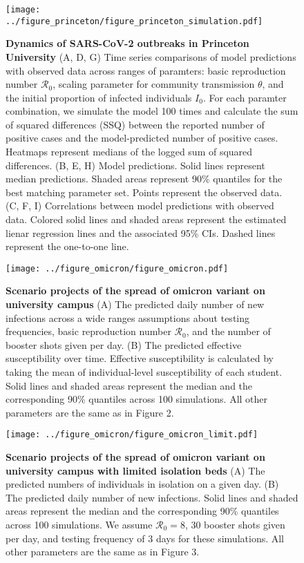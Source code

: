 \documentclass[12pt]{article}
\begin{document}
\pagebreak

\begin{figure}[!th]
\texttt{[image: ../figure\_princeton/figure\_princeton\_simulation.pdf]}
\caption{
\textbf{Dynamics of SARS-CoV-2 outbreaks in Princeton University}
(A, D, G) Time series comparisons of model predictions with observed data across ranges of paramters: basic reproduction number $\mathcal R_0$, scaling parameter for community transmission $\theta$, and the initial proportion of infected individuals $I_0$.
For each paramter combination, we simulate the model 100 times and calculate the sum of squared differences (SSQ) between the reported number of positive cases and the model-predicted number of positive cases. 
Heatmaps represent medians of the logged sum of squared differences.
(B, E, H) Model predictions. 
Solid lines represent median predictions.
Shaded areas represent 90\% quantiles for the best matching parameter set.
Points represent the observed data.
(C, F, I) Correlations between model predictions with observed data.
Colored solid lines and shaded areas represent the estimated lienar regression lines and the associated 95\% CIs.
Dashed lines represent the one-to-one line.
}
\end{figure}

\pagebreak

\begin{figure}[!th]
\texttt{[image: ../figure\_omicron/figure\_omicron.pdf]}
\caption{
\textbf{Scenario projects of the spread of omicron variant on university campus}
(A) The predicted daily number of new infections across a wide ranges assumptions about testing frequencies, basic reproduction number $\mathcal R_0$, and the number of booster shots given per day.
(B) The predicted effective susceptibility over time. 
Effective susceptibility is calculated by taking the mean of individual-level susceptibility of each student.
Solid lines and shaded areas represent the median and the corresponding 90\% quantiles across 100 simulations.
All other parameters are the same as in Figure 2.
}
\end{figure}


\pagebreak

\begin{figure}[!th]
\texttt{[image: ../figure\_omicron/figure\_omicron\_limit.pdf]}
\caption{
\textbf{Scenario projects of the spread of omicron variant on university campus with limited isolation beds}
(A) The predicted numbers of individuals in isolation on a given day.
(B) The predicted daily number of new infections.
Solid lines and shaded areas represent the median and the corresponding 90\% quantiles across 100 simulations.
We assume $\mathcal R_0 = 8$, 30 booster shots given per day, and testing frequency of 3 days for these simulations.
All other parameters are the same as in Figure 3.
}
\end{figure}
\end{document}
